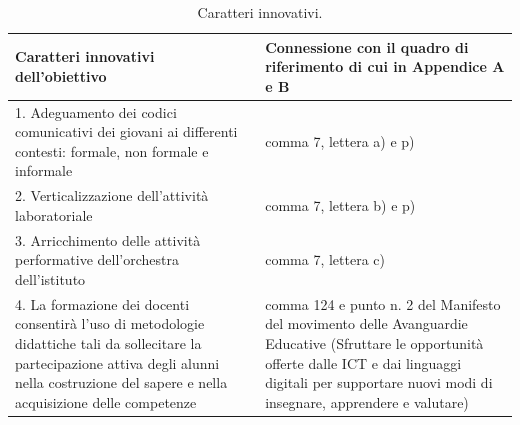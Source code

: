 \documentclass[12pt,a4paper,oneside]{memoir}
\begin{document}
\begin{center}
\end{center}

\begin{table}[htp]
\caption{Caratteri innovativi.}  \label{caratteri-innovativi}
\footnotesize
\begin{tabular}{|>{\raggedright}p{6.2572cm}|>{\raggedright\arraybackslash}p{6.2572cm}|}
\hline
\rowcolor{violetto}
Caratteri innovativi dell'obiettivo&Connessione con il quadro di riferimento di cui in Appendice A e B\\ \hline
1. Adeguamento dei codici comunicativi dei giovani ai differenti contesti: formale, non formale e informale&comma 7, lettera a) e p)\\ \hline
2. Verticalizzazione dell'attività laboratoriale&comma 7, lettera b) e p)\\ \hline
3. Arricchimento delle attività performative dell'orchestra dell'istituto&comma 7, lettera c)\\ \hline
4. La formazione dei docenti consentirà l'uso di metodologie didattiche tali da sollecitare la partecipazione attiva degli alunni nella costruzione del sapere e nella acquisizione delle competenze&comma 124 e punto n. 2 del Manifesto del movimento delle Avanguardie Educative (Sfruttare le opportunità offerte dalle ICT e dai linguaggi digitali per supportare nuovi modi di insegnare, apprendere e valutare)\\ \hline
\end{tabular}
\end{table}
\end{document}
